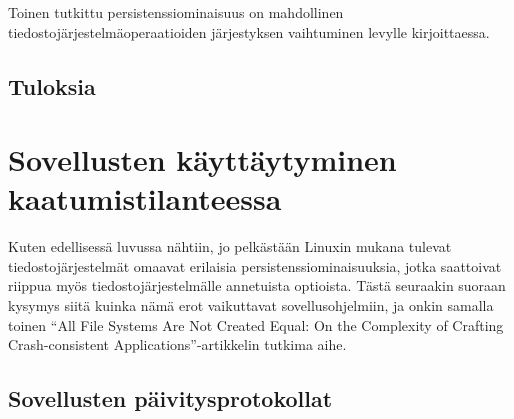 Toinen tutkittu persistenssiominaisuus on mahdollinen tiedostojärjestelmäoperaatioiden järjestyksen vaihtuminen levylle kirjoittaessa.

\subsection{Tuloksia}


\section{Sovellusten käyttäytyminen kaatumistilanteessa}

Kuten edellisessä luvussa nähtiin,
jo pelkästään Linuxin mukana tulevat tiedostojärjestelmät omaavat erilaisia persistenssiominaisuuksia,
jotka saattoivat riippua myös tiedostojärjestelmälle annetuista optioista.
Tästä seuraakin suoraan kysymys siitä kuinka nämä erot vaikuttavat sovellusohjelmiin,
ja onkin samalla toinen ``All File Systems Are Not Created Equal: On the Complexity of Crafting Crash-consistent Applications''-artikkelin tutkima aihe.

\subsection{Sovellusten päivitysprotokollat}

